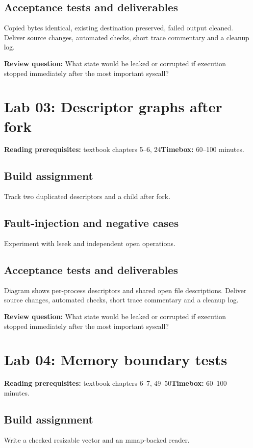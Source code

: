 \documentclass[11pt,letterpaper,oneside]{report}
\begin{document}
\subsection{Acceptance tests and deliverables}
Copied bytes identical, existing destination preserved, failed output cleaned. Deliver source changes, automated checks, short trace commentary and a cleanup log.

\textbf{Review question:} What state would be leaked or corrupted if execution stopped immediately after the most important syscall?

\section{Lab 03: Descriptor graphs after fork}
\textbf{Reading prerequisites:} textbook chapters 5--6, 24\quad \textbf{Timebox:} 60--100 minutes.

\subsection{Build assignment}
Track two duplicated descriptors and a child after fork.

\subsection{Fault-injection and negative cases}
Experiment with lseek and independent open operations.

\subsection{Acceptance tests and deliverables}
Diagram shows per-process descriptors and shared open file descriptions. Deliver source changes, automated checks, short trace commentary and a cleanup log.

\textbf{Review question:} What state would be leaked or corrupted if execution stopped immediately after the most important syscall?

\section{Lab 04: Memory boundary tests}
\textbf{Reading prerequisites:} textbook chapters 6--7, 49--50\quad \textbf{Timebox:} 60--100 minutes.

\subsection{Build assignment}
Write a checked resizable vector and an mmap-backed reader.
\end{document}
